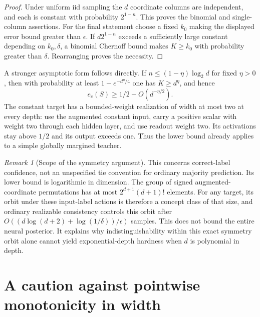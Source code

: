 \documentclass[11pt]{article}
\theoremstyle{remark}\newtheorem{remark}[theorem]{Remark}
\begin{document}
\begin{proof}
Under uniform iid sampling the $d$ coordinate columns are independent,
and each is constant with probability $2^{1-n}$. This proves the
binomial and single-column assertions. For the final statement choose
a fixed $k_0$ making the displayed error bound greater than $\epsilon$.
If $d2^{1-n}$ exceeds a sufficiently large constant depending on
$k_0,\delta$, a binomial Chernoff bound makes $K\ge k_0$ with
probability greater than $\delta$. Rearranging proves the necessity.
\end{proof}

A stronger asymptotic form follows directly. If
$n\le(1-\eta)\log_2d$ for fixed $\eta>0$, then with probability at
least $1-e^{-d^\eta/4}$ one has $K\ge d^\eta$, and hence
\[
 e_c(S)\ge1/2-O(d^{-\eta/2}).
\]
The constant target has a bounded-weight realization of width at most
two at every depth: use the augmented constant input, carry a positive
scalar with weight two through each hidden layer, and use readout
weight two. Its activations stay above $1/2$ and its output exceeds one.
Thus the lower bound already applies to a simple globally margined teacher.

\begin{remark}[Scope of the symmetry argument]
This concerns correct-label confidence, not an unspecified tie convention
for ordinary majority prediction. Its lower bound is logarithmic in
dimension. The group of signed augmented-coordinate permutations has
at most $2^{d+1}(d+1)!$ elements. For any target, its orbit under these
input-label actions is therefore a concept class of that size, and
ordinary realizable consistency controls this orbit after
$O((d\log(d+2)+\log(1/\delta))/\epsilon)$ samples. This does not
bound the entire neural posterior. It explains why indistinguishability
within this exact symmetry orbit alone cannot yield exponential-depth
hardness when $d$ is polynomial in depth.
\end{remark}

\section{A caution against pointwise monotonicity in width}
\end{document}
